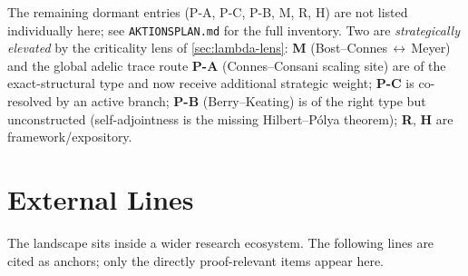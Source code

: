 \documentclass[12pt,a4paper]{article}
\theoremstyle{definition}
\theoremstyle{remark}
\begin{document}
The remaining dormant entries (P-A, P-C, P-B, M, R, H) are not listed
individually here; see \texttt{AKTIONSPLAN.md} for the full inventory. Two are
\emph{strategically elevated} by the criticality lens of
\cref{sec:lambda-lens}: \textbf{M} (Bost--Connes\,$\leftrightarrow$\,Meyer) and
the global adelic trace route \textbf{P-A} (Connes--Consani scaling site) are of
the exact-structural type and now receive additional strategic weight; \textbf{P-C}
is co-resolved by an active branch; \textbf{P-B} (Berry--Keating) is of the right
type but unconstructed (self-adjointness is the missing Hilbert--P\'olya theorem);
\textbf{R}, \textbf{H} are framework/expository.


\section{External Lines}
\label{sec:external}

The landscape sits inside a wider research ecosystem. The following lines
are cited as anchors; only the directly proof-relevant items appear here.
\end{document}
